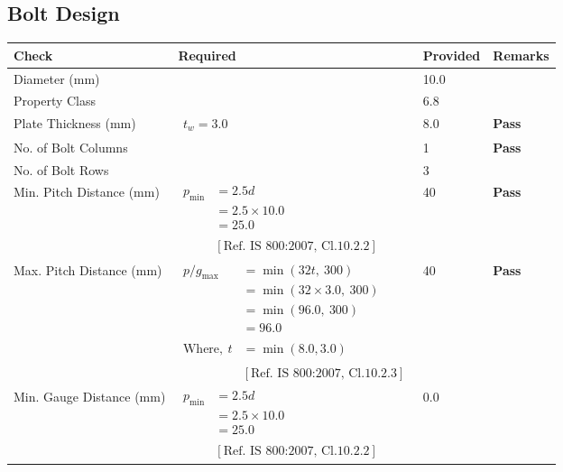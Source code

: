 \documentclass{article}%
\begin{document}
\subsection{Bolt Design}%
\label{subsec:BoltDesign}%
\renewcommand{\arraystretch}{1.2}%
\begin{longtable}{|p{3.5cm}|p{5.3cm}|p{6.7cm}|p{1.5cm}|}%
\hline%
\rowcolor{OsdagGreen}%
Check&Required&Provided&Remarks\\%
\hline%
\endhead%
\hline%
Diameter (mm)&&10.0&\textcolor{OsdagGreen}{ 
\textbf{}
}\\%
\hline%
Property Class&&6.8&\textcolor{OsdagGreen}{ 
\textbf{}
}\\%
\hline%
Plate Thickness (mm)&$\begin{aligned} t_w=3.0\end{aligned}$&8.0&\textcolor{OsdagGreen}{ 
\textbf{Pass}
}\\%
\hline%
No. of Bolt Columns&&1&\textcolor{OsdagGreen}{ 
\textbf{Pass}
}\\%
\hline%
No. of Bolt Rows&&3&\textcolor{OsdagGreen}{ 
\textbf{}
}\\%
\hline%
Min. Pitch Distance (mm)&$\begin{aligned}p_{\min}&= 2.5 d\\ &=2.5 \times10.0\\&=25.0\\ \\ & [\text{Ref. IS 800:2007, Cl.10.2.2}] \end{aligned}$&40&\textcolor{OsdagGreen}{ 
\textbf{Pass}
}\\%
\hline%
Max. Pitch Distance (mm)&$\begin{aligned}p/g_{\max}&=\min(32t,~300)\\ &=\min(32\times3.0,~ 300) \\ &=\min(96.0,~ 300) \\ &=96.0 \\ \\ \text{Where},~t &= \min(8.0,3.0)\\ \\ & [\text{Ref. IS 800:2007, Cl.10.2.3}] \end{aligned}$&40&\textcolor{OsdagGreen}{ 
\textbf{Pass}
}\\%
\hline%
Min. Gauge Distance (mm)&$\begin{aligned}p_{\min}&= 2.5 d\\ &=2.5 \times10.0\\&=25.0\\ \\ & [\text{Ref. IS 800:2007, Cl.10.2.2}] \end{aligned}$&0.0&\textcolor{OsdagGreen}{ 
}
\end{longtable}
\end{document}
